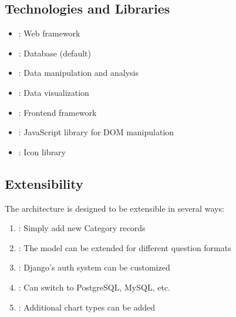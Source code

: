 \documentclass[letterpaper,10pt,english]{sphinxmanual}
\begin{document}
\subsection{Technologies and Libraries}
\label{\detokenize{architecture:technologies-and-libraries}}\begin{itemize}
\item {} 
\sphinxAtStartPar
{}: Web framework

\item {} 
\sphinxAtStartPar
{}: Database (default)

\item {} 
\sphinxAtStartPar
{}: Data manipulation and analysis

\item {} 
\sphinxAtStartPar
{}: Data visualization

\item {} 
\sphinxAtStartPar
{}: Frontend framework

\item {} 
\sphinxAtStartPar
{}: JavaScript library for DOM manipulation

\item {} 
\sphinxAtStartPar
{}: Icon library

\end{itemize}


\subsection{Extensibility}
\label{\detokenize{architecture:extensibility}}
\sphinxAtStartPar
The architecture is designed to be extensible in several ways:
\begin{enumerate}
%
\item {} 
\sphinxAtStartPar
{}: Simply add new Category records

\item {} 
\sphinxAtStartPar
{}: The model can be extended for different question formats

\item {} 
\sphinxAtStartPar
{}: Django’s auth system can be customized

\item {} 
\sphinxAtStartPar
{}: Can switch to PostgreSQL, MySQL, etc.

\item {} 
\sphinxAtStartPar
{}: Additional chart types can be added

\end{enumerate}
\end{document}
